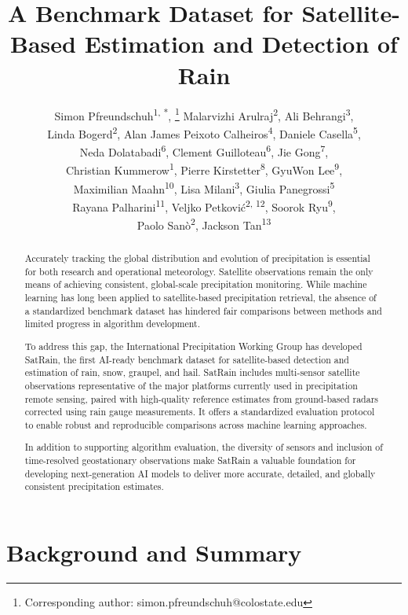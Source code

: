 \documentclass[11pt]{article}
\title{A Benchmark Dataset for Satellite-Based Estimation and Detection of Rain}
\author{%
	Simon Pfreundschuh\textsuperscript{1, *}, \thanks{Corresponding author: simon.pfreundschuh@colostate.edu} %
	Malarvizhi Arulraj\textsuperscript{2}, %
	Ali Behrangi\textsuperscript{3},\\ %
	Linda Bogerd\textsuperscript{2},%
	Alan James Peixoto Calheiros\textsuperscript{4}, %
	Daniele Casella\textsuperscript{5},\\ %
	Neda Dolatabadi\textsuperscript{6}, %
	Clement Guilloteau\textsuperscript{6}, %
	Jie Gong\textsuperscript{7},\\ %
	Christian Kummerow\textsuperscript{1}, %
	Pierre Kirstetter\textsuperscript{8},  %
	GyuWon Lee\textsuperscript{9},\\ %
	Maximilian Maahn\textsuperscript{10}, %
	Lisa Milani\textsuperscript{3}, %
  Giulia Panegrossi\textsuperscript{5} \\ %
	Rayana Palharini\textsuperscript{11},%
	Veljko Petković\textsuperscript{2, 12}, %
	Soorok Ryu\textsuperscript{9},\\ %
	Paolo Sanò\textsuperscript{2}, %
	Jackson Tan\textsuperscript{13}
}
\date{
  \begin{flushleft}
	\footnotesize
	\textsuperscript{1} Department of Atmospheric Science, Colorado State University \\
	\textsuperscript{2} Earth System Science Interdisciplinary Center, University of Maryland  \\
	\textsuperscript{3} Department of Hydrology and Atmospheric Sciences, University of Arizona\\
	\textsuperscript{4} Instituto Nacional de Pesquisas Espaciais \\
	\textsuperscript{5} Institute of Atmospheric Sciences and Climate, Italian National Research Council \\
	\textsuperscript{6} Department of Civil and Environmental Engineering, University of California Irvine \\
	\textsuperscript{7} NASA Goddard Space Flight Center \\
  \textsuperscript{8} School of Meteorology & School of Civil Engineering and Environmental Science, University of Oklahoma \\
	\textsuperscript{9} Department of Atmospheric Sciences, Kyungpook National University \\
	\textsuperscript{10} Institute for Meteorology, University of Leipzig \\
  \textsuperscript{11} Departamento de Prevención de Riegos y Medio Ambiente, Universidad Tecnológica Metropolitana, \\
	\textsuperscript{12} Cooperative Institute for Satellite Earth System Studies, University of Maryland  \\
  \textsuperscript{13} University of Maryland Baltimore County \\
	\end{flushleft}
}
\begin{document}
\maketitle


\begin{abstract}

	Accurately tracking the global distribution and evolution of precipitation is
	essential for both research and operational meteorology. Satellite observations
	remain the only means of achieving consistent, global-scale precipitation
	monitoring. While machine learning has long been applied to satellite-based
	precipitation retrieval, the absence of a standardized benchmark dataset has
	hindered fair comparisons between methods and limited progress in algorithm
	development.

	To address this gap, the International Precipitation Working Group has developed
	SatRain, the first AI-ready benchmark dataset for satellite-based detection and
	estimation of rain, snow, graupel, and hail. SatRain includes multi-sensor
	satellite observations representative of the major platforms currently used in
	precipitation remote sensing, paired with high-quality reference estimates from
	ground-based radars corrected using rain gauge measurements. It offers a
	standardized evaluation protocol to enable robust and reproducible comparisons
	across machine learning approaches.

	In addition to supporting algorithm evaluation, the diversity of
	sensors and inclusion of time-resolved geostationary observations make SatRain a
	valuable foundation for developing next-generation AI models to deliver more
	accurate, detailed, and globally consistent precipitation estimates.

\end{abstract}

\section{Background and Summary}
\end{document}
